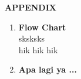 \begin{center}
	\textrm {\bf APPENDIX}
\end{center}

\begin{enumerate}[label=\textbf{\Alph*}]
	\item  \textbf{Flow Chart } \\
	sksksks \\
	hik hik hik
	\item \textbf{Apa lagi ya ...}
\end{enumerate}